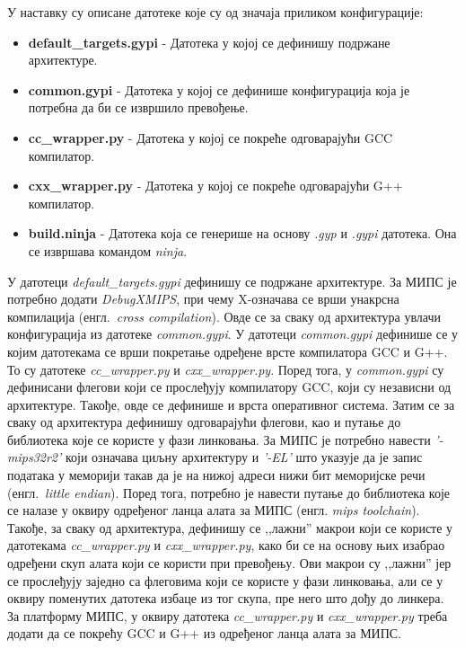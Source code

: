 \documentclass[12pt,oneside]{memoir}
\begin{document}
У наставку су описане датотеке које су од значаја приликом конфигурације:
\begin{itemize}
\item \textbf{default\_targets.gypi} - Датотека у којој се дефинишу подржане архитектуре.
\item \textbf{common.gypi} - Датотека у којој се дефинише конфигурација која је потребна да би се извршило превођење.
\item \textbf{cc\_wrapper.py} - Датотека у којој се покреће одговарајући GCC компилатор.
\item \textbf{cxx\_wrapper.py} - Датотека у којој се покреће одговарајући G++ компилатор.
\item \textbf{build.ninja} - Датотека која се генерише на основу \textit{.gyp} и \textit{.gypi} датотека. Она се извршава командом \textit{ninja}.
\end{itemize}

У датотеци \textit{default\_targets.gypi} дефинишу се подржане архитектуре. За МИПС је потребно додати \textit{DebugXMIPS}, при чему X-означава се врши унакрсна компилација (енгл.~\textit{cross compilation}). Овде се за сваку од архитектура увлачи конфигурација из датотеке \textit{common.gypi}. У датотеци \textit{common.gypi} дефинише се у којим датотекама се врши покретање одређене врсте компилатора GCC и G++. То су датотеке \textit{cc\_wrapper.py} и \textit{cxx\_wrapper.py}. Поред тога, у \textit{common.gypi} су дефинисани флегови који се прослеђују компилатору GCC, који су независни од архитектуре. Такође, овде се дефинише и врста оперативног система. Затим се за сваку од архитектура дефинишу одговарајући флегови, као и путање до библиотека које се користе у фази линковања. За МИПС је потребно навести \textit{'-mips32r2'} који означава циљну архитектуру и \textit{'-EL'} што указује да је запис података у меморији такав да је на нижој адреси нижи бит меморијске речи (енгл.~\textit{little endian}). Поред тога, потребно је навести путање до библиотека које се налазе у оквиру одређеног ланца алата за МИПС (енгл. \textit{mips toolchain}). Такође, за сваку од архитектура, дефинишу се ,,лажни'' макрои који се користе у датотекама \textit{cc\_wrapper.py} и \textit{cxx\_wrapper.py}, како би се на основу њих изабрао одређени скуп алата који се користи при превођењу. Ови макрои су ,,лажни'' јер се прослеђују заједно са флеговима који се користе у фази линковања, али се у оквиру поменутих датотека избаце из тог скупа, пре него што дођу до линкера. За платформу МИПС, у оквиру датотека \textit{cc\_wrapper.py} и \textit{cxx\_wrapper.py} треба додати да се покрећу GCC и G++ из одређеног ланца алата за МИПС.
\end{document}
